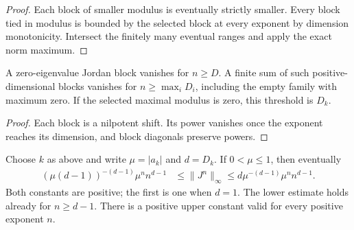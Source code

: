 \begin{proof}
    \leanok
    Each block of smaller modulus is eventually strictly smaller. Every
    block tied in modulus is bounded by the selected block at every
    exponent by dimension monotonicity. Intersect the finitely many
    eventual ranges and apply the exact norm maximum.
\end{proof}

\begin{theorem}
    \label{thm:wolf_finite_jordan_sum_nilpotence}
    \leanok
    A zero-eigenvalue Jordan block vanishes for $n\ge D$. A finite sum of
    such positive-dimensional blocks vanishes for $n\ge\max_i D_i$,
    including the empty family with maximum zero. If the selected maximal
    modulus is zero, this threshold is $D_k$.
\end{theorem}

\begin{proof}
    \leanok
    Each block is a nilpotent shift. Its power vanishes once the exponent
    reaches its dimension, and block diagonals preserve powers.
\end{proof}

\begin{theorem}
    \label{thm:wolf_finite_jordan_sum_polynomial_scaling}
    \leanok
    Choose $k$ as above and write $\mu=|a_k|$ and $d=D_k$.
    If $0<\mu\le1$, then eventually
    \begin{align}
      (\mu(d-1))^{-(d-1)}\mu^n n^{d-1}
        &\le\lVert J^n\rVert_\infty
        \le d\mu^{-(d-1)}\mu^n n^{d-1}.
    \end{align}
    Both constants are positive; the first is one when $d=1$.
    The lower estimate holds already for $n\ge d-1$. There is a positive
    upper constant valid for every positive exponent $n$.
\end{theorem}

